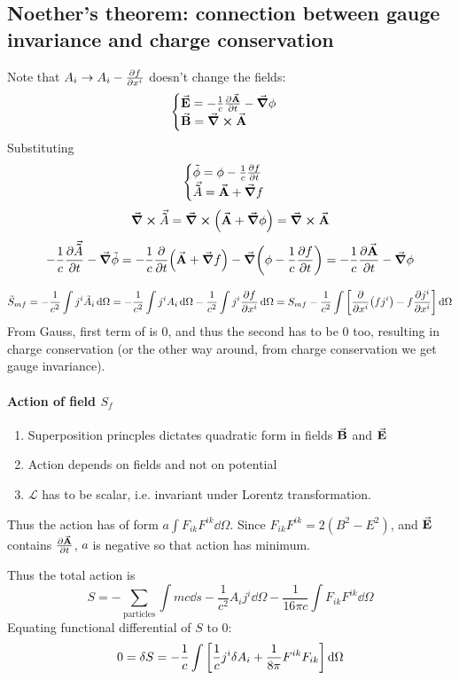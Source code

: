 \subsection{Noether's theorem: connection between gauge invariance and charge conservation}
Note that $A_i \to A_i - \pdv{f}{x^i}$ doesn't change the fields:
$$\begin{cases}
\va{E} = -\frac{1}{c} \pdv{\va{A}}{t} - \grad{\phi}\\
\va{B}= \curl{\va{A}}
\end{cases}$$
Substituting
$$\begin{cases}
\tilde{\phi} = \phi - \frac{1}{c}\pdv{f}{t}\\
\va{\tilde{A}} = \va{A} + \grad{f}
\end{cases}$$
$$\curl{\va{\tilde{A}}} =\curl(\va{A} + \grad{\phi}) = \curl{\va{A}}$$
$$-\frac{1}{c} \pdv{\va{\tilde{A}}}{t} - \grad{\tilde{\phi}} = -\frac{1}{c} \pdv{t} \qty(\va{A} + \grad{f}) - \grad(\phi - \frac{1}{c} \pdv{f}{t}) = -\frac{1}{c} \pdv{\va{A}}{t} - \grad{\phi}$$

$$\tilde{S}_{mf} = -\frac{1}{c^2} \int j^i \tilde{A}_i \dd{\Omega} = -\frac{1}{c^2}\int j^i A_i \dd{\Omega} - \frac{1}{c^2}\int j^i \pdv{f}{x^i} \dd{\Omega} = S_{mf} - \frac{1}{c^2} \int \qty[\pdv{x^i} (fj^i) - f\pdv{j^i}{x^i}] \dd{\Omega}$$
From Gauss, first term of is 0, and thus the second has to be 0 too, resulting in charge conservation (or the other way around, from charge conservation we get gauge invariance).
\paragraph{Action of field $S_f$}
\begin{enumerate}
	\item Superposition princples dictates quadratic form in fields $\va{B}$ and $\va{E}$
	\item Action depends on fields and not on potential
	\item $\mathcal{L}$ has to be scalar, i.e. invariant under Lorentz transformation.
\end{enumerate}
Thus the action has of form $a\int F_{ik}F^{ik} \dd{\Omega}$. Since $F_{ik}F^{ik}=2(B^2-E^2)$, and $\va{E}$ contains $\pdv{\va{A}}{t}$, $a$ is negative so that action has minimum.

Thus the total action is
$$S = -\sum_{\text{particles}} \int mc \dd{s} - \frac{1}{c^2}A_i j^i \dd{\Omega} - \frac{1}{16\pi c} \int F_{ik}F^{ik} \dd{\Omega}$$
Equating functional differential of $S$ to $0$:
$$0 = \delta S = -\frac{1}{c} \int \qty[\frac{1}{c} j^i \delta A_i + \frac{1}{8\pi} F^{ik}F_{ik}] \dd{\Omega}$$

